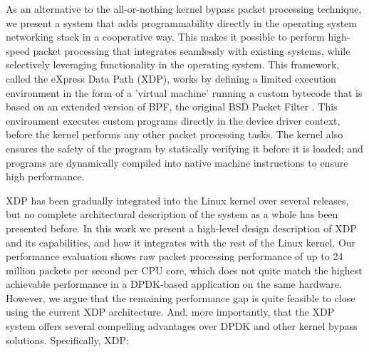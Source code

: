 \documentclass[sigconf]{acmart}
\begin{document}
As an alternative to the all-or-nothing kernel bypass packet processing
technique, we present a system that adds programmability directly in the
operating system networking stack in a cooperative way. This makes it possible
to perform high-speed packet processing that integrates seamlessly with existing
systems, while selectively leveraging functionality in the operating system.
This framework, called the eXpress Data Path (XDP), works by defining a limited
execution environment in the form of a 'virtual machine' running a custom bytecode
that is based on an extended version of BPF, the original BSD Packet Filter
\cite{mccanne_bsd_1993}. This environment executes custom programs directly in
the device driver context, before the kernel performs any other packet processing
tasks. The kernel also ensures the safety of the program by statically verifying
it before it is loaded; and programs are dynamically compiled into native machine
instructions to ensure high performance.

XDP has been gradually integrated into the Linux kernel over several releases,
but no complete architectural description of the system as a whole has been
presented before. In this work we present a high-level design description of XDP
and its capabilities, and how it integrates with the rest of the Linux kernel.
Our performance evaluation shows raw packet processing performance of up to 24
million packets per second per CPU core, which does not quite match the highest
achievable performance in a DPDK-based application on the same hardware.
However, we argue that the remaining performance gap is quite feasible to close
using the current XDP architecture. And, more importantly, that the XDP system
offers several compelling advantages over DPDK and other kernel bypass
solutions. Specifically, XDP:
\end{document}

